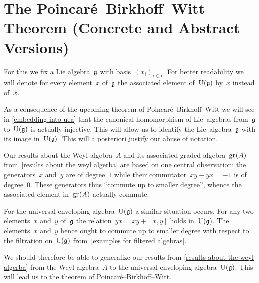 \section{The Poincaré--Birkhoff--Witt Theorem (Concrete and Abstract Versions)}
\label{section for concrete pbw}


\begin{convention}
  For this  we fix a Lie algebra~$\mathfrak{g}$ with basis~$(x_i)_{i \in I}$.
  For better readability we will denote for every element~$x$ of~$\mathfrak{g}$ the associated element of~$\operatorname{U}(\mathfrak{g})$ by~$x$ instead of~$\overline{x}$.
\end{convention}


\begin{remark}
  As a consequence of the upcoming theorem of Poincaré--Birkhoff--Witt we will see in \cref{embedding into uea} that the canonical homomorphism of Lie~algebras from~$\mathfrak{g}$ to~$\operatorname{U}(\mathfrak{g})$ is actually injective.
  This will allow us to identify the Lie~algebra~$\mathfrak{g}$ with its image in~$\operatorname{U}(\mathfrak{g})$.
  This will a posteriori justify our abuse of notation.
\end{remark}


\begin{fluff}
  Our results about the Weyl algebra~$A$ and its associated graded algebra~$\gr(A)$ from~\cref{results about the weyl algerba} are based on one central observation:
  the generators~$x$ and~$y$ are of degree~$1$ while their commutator~$xy - yx = -1$ is of degree~$0$.
  These generators thus \enquote{commute up to smaller degree}, whence the associated element in~$\gr(A)$ actually commute.
  
  For the universal enveloping algebra~$\operatorname{U}(\mathfrak{g})$ a similar situation occurs.
  For any two elements~$x$ and~$y$ of~$\mathfrak{g}$ the relation~$yx = xy + [x,y]$ holds in~$\operatorname{U}(\mathfrak{g})$.
  The elements~$x$ and~$y$ hence ought to commute up to smaller degree with respect to the filtration on~$\operatorname{U}(\mathfrak{g})$ from~\cref{examples for filtered algebras}.

  We should therefore be able to generalize our results from \cref{results about the weyl algerba} from the Weyl algebra~$A$ to the universal enveloping algebra~$\operatorname{U}(\mathfrak{g})$.
  This will lead us to the theorem of Poincaré--Birkhoff--Witt.
\end{fluff}




